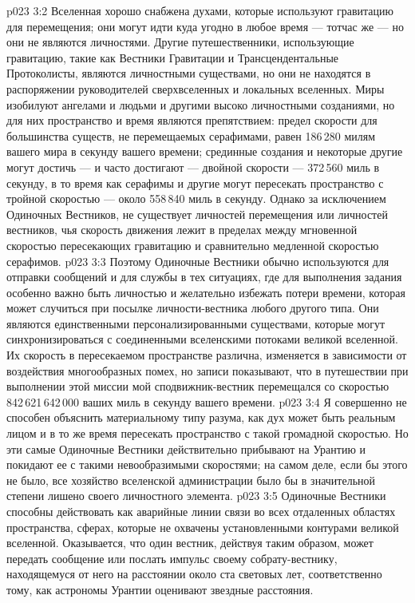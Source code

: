\vs p023 3:2 \pc Вселенная хорошо снабжена духами, которые используют гравитацию для перемещения; они могут идти куда угодно в любое время --- тотчас же --- но они не являются личностями. Другие путешественники, использующие гравитацию, такие как Вестники Гравитации и Трансцендентальные Протоколисты, являются личностными существами, но они не находятся в распоряжении руководителей сверхвселенных и локальных вселенных. Миры изобилуют ангелами и людьми и другими высоко личностными созданиями, но для них пространство и время являются препятствием: предел скорости для большинства существ, не перемещаемых серафимами, равен 186\,280 милям вашего мира в секунду вашего времени; срединные создания и некоторые другие могут достичь --- и часто достигают --- двойной скорости --- 372\,560 миль в секунду, в то время как серафимы и другие могут пересекать пространство с тройной скоростью --- около 558\,840 миль в секунду. Однако за исключением Одиночных Вестников, не существует личностей перемещения или личностей вестников, чья скорость движения лежит в пределах между мгновенной скоростью пересекающих гравитацию и сравнительно медленной скоростью серафимов.
\vs p023 3:3 Поэтому Одиночные Вестники обычно используются для отправки сообщений и для службы в тех ситуациях, где для выполнения задания особенно важно быть личностью и желательно избежать потери времени, которая может случиться при посылке личности\hyp{}вестника любого другого типа. Они являются единственными персонализированными существами, которые могут синхронизироваться с соединенными вселенскими потоками великой вселенной. Их скорость в пересекаемом пространстве различна, изменяется в зависимости от воздействия многообразных помех, но записи показывают, что в путешествии при выполнении этой миссии мой сподвижник\hyp{}вестник перемещался со скоростью 842\,621\,642\,000 ваших миль в секунду вашего времени.
\vs p023 3:4 Я совершенно не способен объяснить материальному типу разума, как дух может быть реальным лицом и в то же время пересекать пространство с такой громадной скоростью. Но эти самые Одиночные Вестники действительно прибывают на Урантию и покидают ее с такими невообразимыми скоростями; на самом деле, если бы этого не было, все хозяйство вселенской администрации было бы в значительной степени лишено своего личностного элемента.
\vs p023 3:5 \pc Одиночные Вестники способны действовать как аварийные линии связи во всех отдаленных областях пространства, сферах, которые не охвачены установленными контурами великой вселенной. Оказывается, что один вестник, действуя таким образом, может передать сообщение или послать импульс своему собрату\hyp{}вестнику, находящемуся от него на расстоянии около ста световых лет, соответственно тому, как астрономы Урантии оценивают звездные расстояния.
